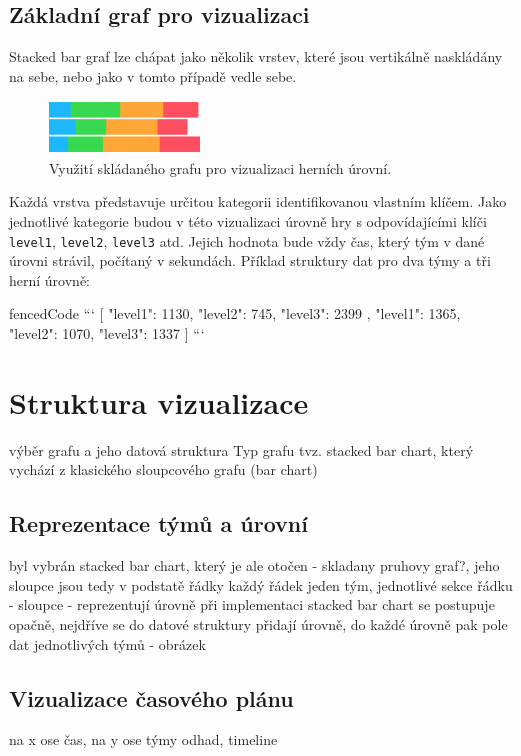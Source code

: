 \documentclass[
  digital, %
  oneside, %
  table,   %
  nolof,     %
  nolot,     %
]{fithesis3}
\begin{document}
\subsection{Základní graf pro vizualizaci}
Stacked bar graf lze chápat jako několik vrstev, které jsou vertikálně naskládány na sebe, nebo jako v tomto případě vedle sebe.
\begin{figure}[H]
  \begin{center}
    \includegraphics[width=4cm]{images/stack-ctf.pdf}
  \end{center}
  \caption{Využití skládaného grafu pro vizualizaci herních úrovní.}
  \label{fig:visualizationChart}
\end{figure}
Každá vrstva představuje určitou kategorii identifikovanou vlastním klíčem. Jako jednotlivé kategorie budou v této vizualizaci úrovně hry s odpovídajícími klíči \verb|level1|, \verb|level2|, \verb|level3| atd. Jejich hodnota bude vždy čas, který tým v dané úrovni strávil, počítaný v sekundách. Příklad struktury dat pro dva týmy a tři herní úrovně:
\begin{markdown*}{
  fencedCode
}
```
[{ "level1": 1130, "level2": 745, "level3": 2399 },
{ "level1": 1365, "level2": 1070, "level3": 1337 }]
```
\end{markdown*}

\section{Struktura vizualizace}
výběr grafu a jeho datová struktura
Typ grafu tvz. stacked bar chart, který vychází z klasického sloupcového grafu (bar chart)


\subsection{Reprezentace týmů a úrovní}
byl vybrán stacked bar chart, který je ale otočen - skladany pruhovy graf?, jeho sloupce jsou tedy v podstatě řádky
každý řádek jeden tým, jednotlivé sekce řádku - sloupce - reprezentují úrovně
při implementaci stacked bar chart se postupuje opačně, nejdříve se do datové struktury přidají úrovně, do každé úrovně pak pole dat jednotlivých týmů - obrázek
\subsection{Vizualizace časového plánu}
na x ose čas, na y ose týmy
odhad, timeline
\end{document}

